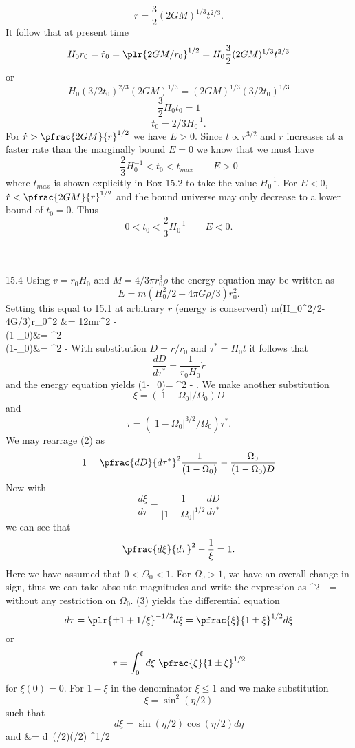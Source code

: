 \documentclass[10pt,letterpaper]{article}
\begin{document}
\[
	r = \frac32 (2GM)^{1/3}t^{2/3}.
\]
It follow that at present time
\[
	H_0 r_0 = \dot r_0 = \plr{2GM/r_0}^{1/2} = H_0 \frac32 (2GM)^{1/3}t^{2/3}
\]
or
\[
	H_0(3/2 t_0)^{2/3}(2GM)^{1/3} = (2GM)^{1/3}(3/2 t_0)^{1/3}
\]
\[
	\frac32 H_0t_0 = 1
\]
\[
	t_0 = 2/3 H_0^{-1}.
\]
For $\dot r > \pfrac{2GM}{r}^{1/2}$ we have $E>0$. Since $t \propto r^{3/2}$ and $r$ increases at a faster rate than the marginally bound $E=0$ we know that we must have
\[
	\frac 23 H_0^{-1} < t_0 < t_{max}\qquad E>0
\]
where $t_{max}$ is shown explicitly in Box 15.2 to take the value $H_0^{-1}$. For $E<0$, $\dot r <  \pfrac{2GM}{r}^{1/2}$ and the bound universe may only decrease to a lower bound of $t_0 = 0$. Thus
\[
	0 < t_0 < \frac23 H_0^{-1}\qquad E<0.
\]
\\ \\
\item[15.4]
Using $v = r_0H_0$ and $M = 4/3\pi r_0^3\rho$ the energy equation may be written as
\[
	E = m(H_0^2/2-4\pi G\rho /3)r_0^2.
\]
Setting this equal to 15.1 at arbitrary $r$ (energy is conserverd)
\ba
	m(H_0^2/2-4\pi G\rho /3)r_0^2 &= \frac12m\dot r^2 - \\
	(1-\Omega_0)&= ^2 - \\
	(1-\Omega_0)&= ^2 - 
\ea
With substitution $D = r/r_0$ and $\tau^* = H_0 t$ it follows that
\[
	\frac{dD}{d\tau^*} = \frac{1}{r_0H_0}\dot r
\]
and the energy equation yields
\be
	(1-\Omega_0)= ^2 - .
\ee
We make another substitution
\[
	\xi = (|1-\Omega_0|/\Omega_0)D
\]
and
\[
	\tau = (|1-\Omega_0|^{3/2}/\Omega_0)\tau^*.
\]
We may rearrage (2) as
\[
	1 =  \pfrac{dD}{d\tau^*}^2\frac{1}{(1-\Omega_0)}-\frac{\Omega_0}{(1-\Omega_0)D} 
\]
Now with
\[
	\frac{d\xi}{d\tau} = \frac{1}{|1-\Omega_0|^{1/2}}\frac{dD}{d\tau^*}
\]
we can see that
\[
	\pfrac{d\xi}{d\tau}^2 - \frac{1}{\xi} = 1.
\]
Here we have assumed that $0<\Omega_0 < 1$. For $\Omega_0 > 1$, we have an overall change in sign, thus we can take absolute magnitudes and write the expression as
\be
	^2 -  = 
\ee
without any restriction on $\Omega_0$. (3) yields the differential equation
\[
	d\tau = \plr{ \pm 1 +1/\xi}^{-1/2}d\xi = \pfrac{ \xi}{1\pm \xi}^{1/2} d\xi
\]
or
\[
	\tau = \int_0^\xi d\xi\  \pfrac{ \xi}{1\pm \xi}^{1/2}
\]
for $\xi(0) = 0$. For $1-\xi$ in the denominator $\xi \le 1$ and we make substitution
\[
	\xi = \sin^2(\eta/2)
\]
such that
\[
	d\xi = \sin(\eta/2)\cos(\eta/2)d\eta
\]
and
\ba
	\tau &= \int d\eta\ \sin(\eta/2)\cos(\eta/2) ^{1/2}\\
\end{document}
